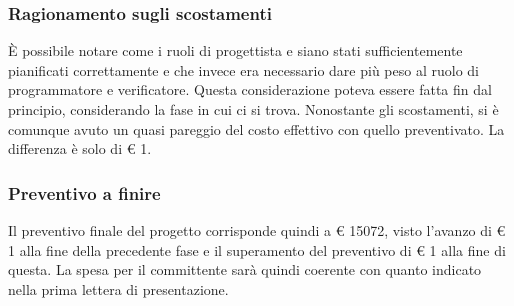 \subsubsection{Ragionamento sugli scostamenti}
È possibile notare come i ruoli di progettista e  siano stati sufficientemente pianificati correttamente e che invece era necessario dare più peso al ruolo di programmatore e verificatore. Questa considerazione poteva essere fatta fin dal principio, considerando la fase in cui ci si trova.\newline
Nonostante gli scostamenti, si è comunque avuto un quasi pareggio del costo effettivo con quello preventivato. La differenza è solo di \euro{} 1.

\subsubsection{Preventivo a finire}
Il preventivo finale del progetto corrisponde quindi a \euro{} 15072, visto l'avanzo di \euro{} 1 alla fine della precedente fase e il superamento del preventivo di \euro{} 1 alla fine di questa. La spesa per il committente sarà quindi coerente con quanto indicato nella prima lettera di presentazione. 